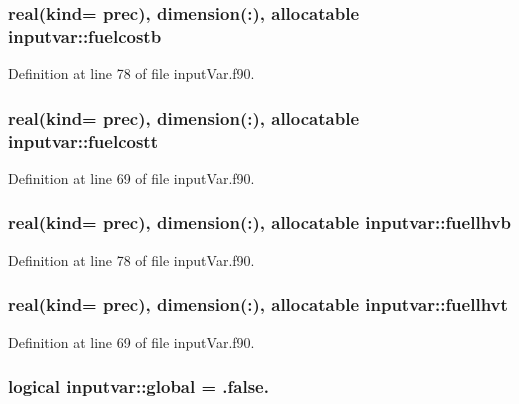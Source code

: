 \hypertarget{classinputvar_a7ba5eba73efe4e693920d6af7782e58e}{
\subsubsection[{fuelcostb}]{\setlength{\rightskip}{0pt plus 5cm}real(kind= prec), dimension(\-:), allocatable inputvar\-::fuelcostb}}\label{classinputvar_a7ba5eba73efe4e693920d6af7782e58e}


Definition at line 78 of file input\-Var.\-f90.

\hypertarget{classinputvar_a85ccff6d868e650d2255bb9faa7c31be}{
\subsubsection[{fuelcostt}]{\setlength{\rightskip}{0pt plus 5cm}real(kind= prec), dimension(\-:), allocatable inputvar\-::fuelcostt}}\label{classinputvar_a85ccff6d868e650d2255bb9faa7c31be}


Definition at line 69 of file input\-Var.\-f90.

\hypertarget{classinputvar_a3cd62c9288fded8bd8de8066cbb3ca20}{
\subsubsection[{fuellhvb}]{\setlength{\rightskip}{0pt plus 5cm}real(kind= prec), dimension(\-:), allocatable inputvar\-::fuellhvb}}\label{classinputvar_a3cd62c9288fded8bd8de8066cbb3ca20}


Definition at line 78 of file input\-Var.\-f90.

\hypertarget{classinputvar_afe467edd87c4c589d3ad9d5b14825f94}{
\subsubsection[{fuellhvt}]{\setlength{\rightskip}{0pt plus 5cm}real(kind= prec), dimension(\-:), allocatable inputvar\-::fuellhvt}}\label{classinputvar_afe467edd87c4c589d3ad9d5b14825f94}


Definition at line 69 of file input\-Var.\-f90.

\hypertarget{classinputvar_aa558f36057a5ae647fb16b9659b90d04}{
\subsubsection[{global}]{\setlength{\rightskip}{0pt plus 5cm}logical inputvar\-::global = .false.}}\label{classinputvar_aa558f36057a5ae647fb16b9659b90d04}


